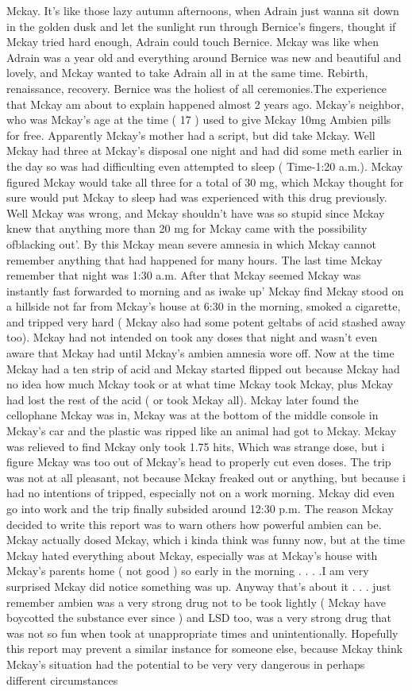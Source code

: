 \documentclass[12pt]{book}
\begin{document}
Mckay. It's like those lazy autumn afternoons, when Adrain just wanna sit down in the golden dusk and let the sunlight run through Bernice's fingers, thought if Mckay tried hard enough, Adrain could touch Bernice. Mckay was like when Adrain was a year old and everything around Bernice was new and beautiful and lovely, and Mckay wanted to take Adrain all in at the same time. Rebirth, renaissance, recovery. Bernice was the holiest of all ceremonies.The experience that Mckay am about to explain happened almost 2 years ago. Mckay's neighbor, who was Mckay's age at the time ( 17 ) used to give Mckay 10mg Ambien pills for free. Apparently Mckay's mother had a script, but did take Mckay. Well Mckay had three at Mckay's disposal one night and had did some meth earlier in the day so was had difficulting even attempted to sleep ( Time-1:20 a.m.). Mckay figured Mckay would take all three for a total of 30 mg, which Mckay thought for sure would put Mckay to sleep had was experienced with this drug previously. Well Mckay was wrong, and Mckay shouldn't have was so stupid since Mckay knew that anything more than 20 mg for Mckay came with the possibility ofblacking out'. By this Mckay mean severe amnesia in which Mckay cannot remember anything that had happened for many hours. The last time Mckay remember that night was 1:30 a.m. After that Mckay seemed Mckay was instantly fast forwarded to morning and as iwake up' Mckay find Mckay stood on a hillside not far from Mckay's house at 6:30 in the morning, smoked a cigarette, and tripped very hard ( Mckay also had some potent geltabs of acid stashed away too). Mckay had not intended on took any doses that night and wasn't even aware that Mckay had until Mckay's ambien amnesia wore off. Now at the time Mckay had a ten strip of acid and Mckay started flipped out because Mckay had no idea how much Mckay took or at what time Mckay took Mckay, plus Mckay had lost the rest of the acid ( or took Mckay all). Mckay later found the cellophane Mckay was in, Mckay was at the bottom of the middle console in Mckay's car and the plastic was ripped like an animal had got to Mckay. Mckay was relieved to find Mckay only took 1.75 hits, Which was strange dose, but i figure Mckay was too out of Mckay's head to properly cut even doses. The trip was not at all pleasant, not because Mckay freaked out or anything, but because i had no intentions of tripped, especially not on a work morning. Mckay did even go into work and the trip finally subsided around 12:30 p.m. The reason Mckay decided to write this report was to warn others how powerful ambien can be. Mckay actually dosed Mckay, which i kinda think was funny now, but at the time Mckay hated everything about Mckay, especially was at Mckay's house with Mckay's parents home ( not good ) so early in the morning . . .  .I am very surprised Mckay did notice something was up. Anyway that's about it . . .  just remember ambien was a very strong drug not to be took lightly ( Mckay have boycotted the substance ever since ) and LSD too, was a very strong drug that was not so fun when took at unappropriate times and unintentionally. Hopefully this report may prevent a similar instance for someone else, because Mckay think Mckay's situation had the potential to be very very dangerous in perhaps different circumstances 
\end{document}
